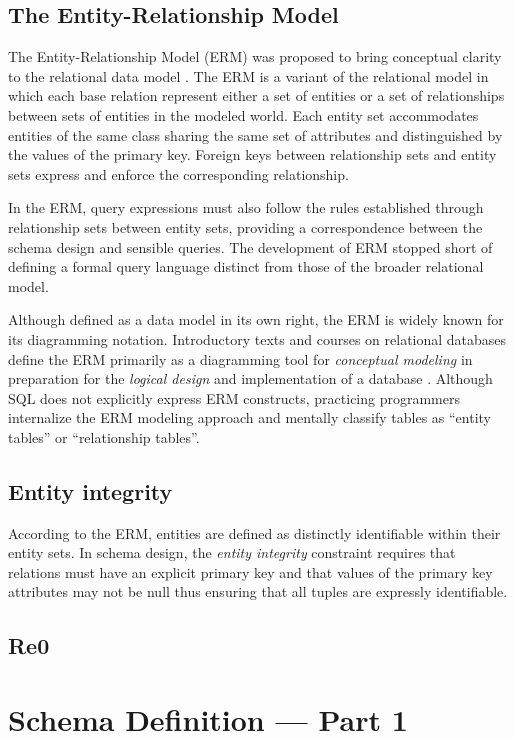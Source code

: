 \documentclass[letter,twocolumn,10pt]{article}
\begin{document}
\subsection{The Entity-Relationship Model}
The Entity-Relationship Model (ERM) was proposed to bring conceptual clarity to the relational data model \citep{chen_entity_1976}.  
The ERM is a variant of the relational model in which each base relation represent either a set of entities or a set of relationships between sets of entities in the modeled world. 
Each entity set accommodates entities of the same class sharing the same set of attributes and distinguished by the values of the primary key.
Foreign keys between relationship sets and entity sets express and enforce the corresponding relationship.

In the ERM, query expressions must also follow the rules established through relationship sets between entity sets, providing a correspondence between the schema design and sensible queries. 
The development of ERM stopped short of defining a formal query language distinct from those of the broader relational model.

Although defined as a data model in its own right, the ERM is widely known for its diagramming notation. 
Introductory texts and courses on relational databases define the ERM primarily as a diagramming tool for \emph{conceptual modeling} in preparation for the \emph{logical design} and implementation of a database \citep{elmasri-2015-fundamentals, coronel-2016-database}.
Although SQL does not explicitly express ERM constructs, practicing programmers internalize the ERM modeling approach and mentally classify tables as ``entity tables'' or ``relationship tables''.

\subsection{Entity integrity}
According to the ERM, entities are defined as distinctly identifiable within their entity sets. 
In schema design, the \emph{entity integrity} constraint requires that relations must have an explicit primary key and that values of the primary key attributes may not be null thus ensuring that all tuples are expressly identifiable.

\subsection{Re0}

\section{Schema Definition --- Part 1}
\end{document}
